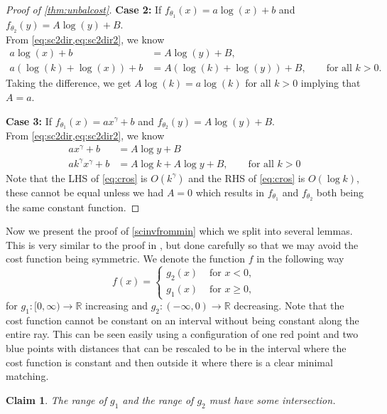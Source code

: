 \documentclass{article}
\newtheorem{claim}{Claim}
\newcommand{\ti}{{\theta_1}}
\newcommand{\tii}{{\theta_2}}
\begin{document}
\begin{proof}[Proof of \cref{thm:unbalcost}]
  {\bf Case 2:} If $f_{\theta_1}(x) = a \log(x) +b$ and
  $f_{\theta_2}(y) = A\log(y)+B$.\\
  From \cref{eq:sc2dir,eq:sc2dir2}, we
  know
  \begin{align}
    a\log(x) +b &= A\log(y) +B, \nonumber\\
    a(\log(k)+ \log(x)) +b &= A(\log(k)+\log(y)) +B, \qquad \mbox{for
    all } k>0.\nonumber
 \end{align}
  Taking the difference, we get
  $A\log(k)=a\log(k)$ for all $k>0$ implying that $A=a$.

  {\bf Case 3:} If $f_\ti(x) =ax^\gamma+b$ and $f_\tii(y) =
  A\log(y)+B$.\\
  From \cref{eq:sc2dir,eq:sc2dir2}, we
  know
  \begin{align}\label{eq:cros}
    ax^\gamma +b &= A\log y +B\nonumber\\
    ak^\gamma x^\gamma +b &= A\log k+A\log y +B, \qquad \mbox{for all
    }k>0
  \end{align}
Note that the LHS of \cref{eq:cros} is $O(k^\gamma)$ and the RHS of
\cref{eq:cros} is $O(\log k)$, these cannot be equal unless we had
$A=0$ which results in $f_\ti$ and $f_\tii$ both being the same
constant function.
\end{proof}

Now we present the proof of \cref{scinvfrommin} which we split into
several lemmas. This is very similar to the proof in \cite[Proposition
18]{minimal}, but done carefully so that we may avoid the cost
function being symmetric. We denote the function $f$ in the following way
  \begin{equation}\label{eq:phantom}
    f(x) =
    \begin{cases}
      g_2(x) & \text{ for } x < 0,\\
      g_1(x) & \text{ for } x\geq 0,
    \end{cases}
  \end{equation}
  for $g_1:[0,\infty)\rightarrow \mathbb{R}$ increasing and
  $g_2:(-\infty,0)\rightarrow \mathbb{R}$ decreasing.
{
 Note that the cost function cannot be constant on an interval
 without being constant along the entire ray. This can be seen easily
 using a configuration of one red point and two blue points with
 distances that can be rescaled to be in the interval where the cost
 function is constant and then outside it where there is a clear
 minimal matching.
}

  \begin{claim} \label{cl:ranges}
    The range of $g_1$ and the range of $g_2$ must have some
    intersection.
  \end{claim}
\end{document}
